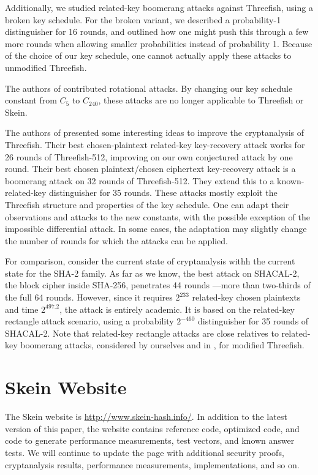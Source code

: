 \documentclass[11pt,twoside]{article}
\newcommand{\purl}{\protect\url}
\newcommand{\TheConst}{C_{240}} %
\begin{document}
Additionally, we studied related-key boomerang attacks against Threefish, using a broken key schedule. For the broken variant, we described a probability-1 distinguisher for 16 rounds, and outlined how one might push this through a few more rounds when allowing smaller probabilities instead of probability 1. Because of the choice of our key schedule, one cannot actually apply these attacks to unmodified Threefish.

The authors of \cite{KN10,RKN10} contributed rotational attacks. By changing our
key schedule constant from $C_5$ to $\TheConst$, these attacks are no longer
applicable to Threefish or Skein.

The authors of \cite{ACMOPV09} presented some interesting ideas to improve the cryptanalysis of Threefish. Their best chosen-plaintext related-key key-recovery attack works for 26 rounds of Threefish-512, improving on our own conjectured attack by one round. Their best chosen plaintext/chosen ciphertext key-recovery attack is a boomerang attack on 32 rounds of Threefish-512. They extend this to a known-related-key distinguisher for 35 rounds. These attacks mostly exploit the Threefish structure and properties of the key schedule. One can adapt their observations and attacks to the new constants, with the possible exception of the impossible differential attack. In some cases, the adaptation may slightly change the number of rounds for which the attacks can be applied.  

For comparison, consider the current state of cryptanalysis withh the
current state for the SHA-2 family.  As far as we know, the best
attack on SHACAL-2, the block cipher inside SHA-256, penetrates 44
rounds \cite{LK08}---more than two-thirds of the full 64 rounds.
However, since it requires $2^{233}$ related-key chosen plaintexts and
time $2^{497.2}$, the attack is entirely academic.  It is based on the
related-key rectangle attack scenario, using a probability $2^{-460}$
distinguisher for 35 rounds of SHACAL-2. Note that related-key
rectangle attacks are close relatives to related-key boomerang
attacks, considered by ourselves and in \cite{ACMOPV09}, for modified
Threefish.


\section{Skein Website}
\label{sec:website}

The Skein website is \purl{http://www.skein-hash.info/}.  In addition to the latest version of this paper, the website contains reference code, optimized code, and code to generate performance measurements, test vectors, and known answer tests.  We will continue to update the page with additional security proofs, cryptanalysis results, performance measurements, implementations, and so on.
\end{document}
